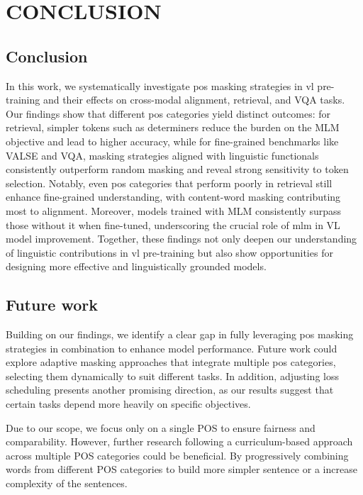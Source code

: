 \chapter{CONCLUSION}
\section{Conclusion}
In this work, we systematically investigate \acrshort{pos} masking strategies in \Acrshort{vl} pre-training and their effects on cross-modal alignment, retrieval, and VQA tasks.
Our findings show that different \acrshort{pos} categories yield distinct outcomes: for retrieval, simpler tokens such as determiners reduce the burden on the MLM objective and lead to higher accuracy, while for fine-grained benchmarks like VALSE and VQA, masking strategies aligned with linguistic functionals consistently outperform random masking and reveal strong sensitivity to token selection.
Notably, even \acrshort{pos} categories that perform poorly in retrieval still enhance fine-grained understanding, with content-word masking contributing most to alignment.
Moreover, models trained with MLM consistently surpass those without it when fine-tuned, underscoring the crucial role of \acrshort{mlm} in VL model improvement.
Together, these findings not only deepen our understanding of linguistic contributions in \acrshort{vl} pre-training but also show opportunities for designing more effective and linguistically grounded models.

\section{Future work}
Building on our findings, we identify a clear gap in fully leveraging \acrshort{pos} masking strategies in combination to enhance model performance.
Future work could explore adaptive masking approaches that integrate multiple \acrshort{pos} categories, selecting them dynamically to suit different tasks.
In addition, adjusting loss scheduling presents another promising direction, as our results suggest that certain tasks depend more heavily on specific objectives.

Due to our scope, we focus only on a single POS to ensure fairness and comparability.
However, further research following a curriculum-based approach across multiple POS categories could be beneficial.
By progressively combining words from different POS categories to build more simpler sentence or a increase complexity of the sentences.
